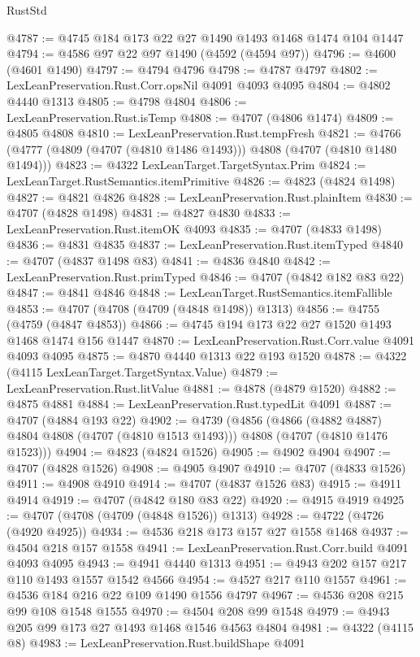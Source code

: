 \begin{lexlean}{RustStd}
\begin{coremodule}
@4787 := @4745 @184 @173 @22 @27 @1490 @1493 @1468 @1474 @104 @1447
@4794 := @4586 @97 @22 @97 @1490 (@4592 (@4594 @97))
@4796 := @4600 (@4601 @1490)
@4797 := @4794 @4796
@4798 := @4787 @4797
@4802 := LexLeanPreservation.Rust.Corr.opsNil @4091 @4093 @4095
@4804 := @4802 @4440 @1313
@4805 := @4798 @4804
@4806 := LexLeanPreservation.Rust.isTemp
@4808 := @4707 (@4806 @1474)
@4809 := @4805 @4808
@4810 := LexLeanPreservation.Rust.tempFresh
@4821 := @4766 (@4777 (@4809 (@4707 (@4810 @1486 @1493))) @4808 (@4707 (@4810 @1480 @1494)))
@4823 := @4322 LexLeanTarget.TargetSyntax.Prim
@4824 := LexLeanTarget.RustSemantics.itemPrimitive
@4826 := @4823 (@4824 @1498)
@4827 := @4821 @4826
@4828 := LexLeanPreservation.Rust.plainItem
@4830 := @4707 (@4828 @1498)
@4831 := @4827 @4830
@4833 := LexLeanPreservation.Rust.itemOK @4093
@4835 := @4707 (@4833 @1498)
@4836 := @4831 @4835
@4837 := LexLeanPreservation.Rust.itemTyped
@4840 := @4707 (@4837 @1498 @83)
@4841 := @4836 @4840
@4842 := LexLeanPreservation.Rust.primTyped
@4846 := @4707 (@4842 @182 @83 @22)
@4847 := @4841 @4846
@4848 := LexLeanTarget.RustSemantics.itemFallible
@4853 := @4707 (@4708 (@4709 (@4848 @1498)) @1313)
@4856 := @4755 (@4759 (@4847 @4853))
@4866 := @4745 @194 @173 @22 @27 @1520 @1493 @1468 @1474 @156 @1447
@4870 := LexLeanPreservation.Rust.Corr.value @4091 @4093 @4095
@4875 := @4870 @4440 @1313 @22 @193 @1520
@4878 := @4322 (@4115 LexLeanTarget.TargetSyntax.Value)
@4879 := LexLeanPreservation.Rust.litValue
@4881 := @4878 (@4879 @1520)
@4882 := @4875 @4881
@4884 := LexLeanPreservation.Rust.typedLit @4091
@4887 := @4707 (@4884 @193 @22)
@4902 := @4739
    (@4856
      (@4866 (@4882 @4887) @4804 @4808 (@4707 (@4810 @1513 @1493)))
      @4808
      (@4707 (@4810 @1476 @1523)))
@4904 := @4823 (@4824 @1526)
@4905 := @4902 @4904
@4907 := @4707 (@4828 @1526)
@4908 := @4905 @4907
@4910 := @4707 (@4833 @1526)
@4911 := @4908 @4910
@4914 := @4707 (@4837 @1526 @83)
@4915 := @4911 @4914
@4919 := @4707 (@4842 @180 @83 @22)
@4920 := @4915 @4919
@4925 := @4707 (@4708 (@4709 (@4848 @1526)) @1313)
@4928 := @4722 (@4726 (@4920 @4925))
@4934 := @4536 @218 @173 @157 @27 @1558 @1468
@4937 := @4504 @218 @157 @1558
@4941 := LexLeanPreservation.Rust.Corr.build @4091 @4093 @4095
@4943 := @4941 @4440 @1313
@4951 := @4943 @202 @157 @217 @110 @1493 @1557 @1542 @4566
@4954 := @4527 @217 @110 @1557
@4961 := @4536 @184 @216 @22 @109 @1490 @1556 @4797
@4967 := @4536 @208 @215 @99 @108 @1548 @1555
@4970 := @4504 @208 @99 @1548
@4979 := @4943 @205 @99 @173 @27 @1493 @1468 @1546 @4563 @4804
@4981 := @4322 (@4115 @8)
@4983 := LexLeanPreservation.Rust.buildShape @4091

\end{coremodule}
\end{lexlean}
